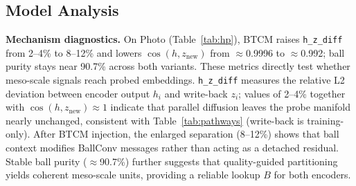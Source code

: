 \documentclass[conference]{IEEEtran}
\begin{document}
\subsection{Model Analysis}

\textbf{Mechanism diagnostics.}
On Photo (Table~\ref{tab:hp}), BTCM raises \texttt{h\_z\_diff} from 2--4\% to 8--12\% and lowers $\cos(h,z_{\mathrm{new}})$ from $\approx$0.9996 to $\approx$0.992; ball purity stays near 90.7\% across both variants.
These metrics directly test whether meso-scale signals reach probed embeddings.
\texttt{h\_z\_diff} measures the relative L2 deviation between encoder output $h_i$ and write-back $z_i$; values of 2--4\% together with $\cos(h,z_{\mathrm{new}})\!\approx\!1$ indicate that parallel diffusion leaves the probe manifold nearly unchanged, consistent with Table~\ref{tab:pathways} (write-back is training-only).
After BTCM injection, the enlarged separation (8--12\%) shows that ball context modifies BallConv messages rather than acting as a detached residual.
Stable ball purity ($\approx$90.7\%) further suggests that quality-guided partitioning yields coherent meso-scale units, providing a reliable lookup $B$ for both encoders.
\end{document}
